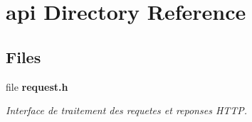 \section{api Directory Reference}
\label{dir_0188a3e6da905bc60aceb35bf790b8c9}
\subsection*{Files}
\begin{DoxyCompactItemize}
\item 
file {\bf request.\+h}
\begin{DoxyCompactList}\small\item\em Interface de traitement des requetes et reponses H\+T\+T\+P. \end{DoxyCompactList}\end{DoxyCompactItemize}
